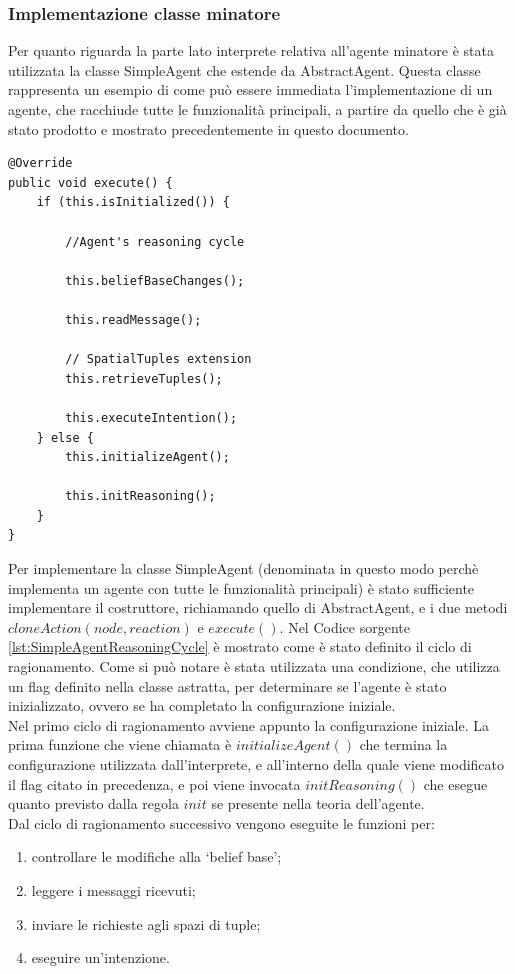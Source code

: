 \subsubsection{Implementazione classe minatore}
Per quanto riguarda la parte lato interprete relativa all'agente minatore è stata utilizzata la classe SimpleAgent che estende da AbstractAgent. Questa classe rappresenta un esempio di come può essere immediata l'implementazione di un agente, che racchiude tutte le funzionalità principali, a partire da quello che è già stato prodotto e mostrato precedentemente in questo documento.
\medskip
\begin{lstlisting}[firstnumber=1,label={lst:SimpleAgentReasoningCycle},caption={Ciclo di ragionamento per l'agente completo}]
@Override
public void execute() {
    if (this.isInitialized()) {
    
        //Agent's reasoning cycle
    
        this.beliefBaseChanges();
    
        this.readMessage();
    
        // SpatialTuples extension
        this.retrieveTuples();
    
        this.executeIntention();
    } else {
        this.initializeAgent();
        
        this.initReasoning();
    }
}
\end{lstlisting}
Per implementare la classe SimpleAgent (denominata in questo modo perchè implementa un agente con tutte le funzionalità principali) è stato sufficiente implementare il costruttore, richiamando quello di AbstractAgent, e i due metodi $cloneAction(node, reaction)$ e $execute()$.
Nel Codice sorgente \ref{lst:SimpleAgentReasoningCycle} è mostrato come è stato definito il ciclo di ragionamento.
Come si può notare è stata utilizzata una condizione, che utilizza un flag definito nella classe astratta, per determinare se l'agente è stato inizializzato, ovvero se ha completato la configurazione iniziale.
\\
Nel primo ciclo di ragionamento avviene appunto la configurazione iniziale. La prima funzione che viene chiamata è $initializeAgent()$ che termina la configurazione utilizzata dall'interprete, e all'interno della quale viene modificato il flag citato in precedenza, e poi viene invocata $initReasoning()$ che esegue quanto previsto dalla regola $init$ se presente nella teoria dell'agente.
\\
Dal ciclo di ragionamento successivo vengono eseguite le funzioni per:
\begin{enumerate}
\item controllare le modifiche alla `belief base';
\item leggere i messaggi ricevuti;
\item inviare le richieste agli spazi di tuple;
\item eseguire un'intenzione.
\end{enumerate}
